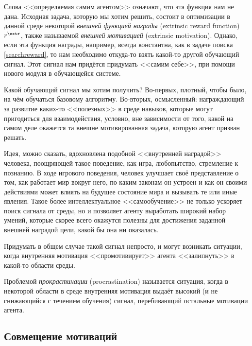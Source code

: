 Слова <<определяемая самим агентом>> означают, что эта функция нам не дана. Исходная задача, которую мы хотим решить, состоит в оптимизации в данной среде некоторой \emph{внешней функцией награды} (extrinsic reward function) $r^{\extr}$, также называемой \emph{внешней мотивацией} (extrinsic motivation). Однако, если эта функция награды, например, всегда константна, как в задаче поиска \eqref{searchreward}, то нам необходимо откуда-то взять какой-то другой обучающий сигнал. Этот сигнал нам придётся придумать <<самим себе>>, при помощи нового модуля в обучающейся системе.

Какой обучающий сигнал мы хотим получить? Во-первых, плотный, чтобы было, на чём обучаться базовому алгоритму. Во-вторых, осмысленный: награждающий за развитие каких-то <<полезных>> в среде навыков, которые могут пригодиться для взаимодействия, условно, вне зависимости от того, какой на самом деле окажется та внешне мотивированная задача, которую агент призван решать.

\begin{example}
Идея, можно сказать, вдохновлена подобной <<внутренней наградой>> человека, поощряющей такое поведение, как игра, любопытство, стремление к познанию. В ходе игрового поведения, человек улучшает своё представление о том, как работает мир вокруг него, по каким законам он устроен и как он своими действиями может влиять на будущее состояние мира и вызывать те или иные явления. Такое более интеллектуальное <<самообучение>> не только ускоряет поиск сигнала от среды, но и позволяет агенту выработать широкий набор умений, которые скорее всего окажутся полезны для достижения заданной внешней наградой цели, какой бы она ни оказалась.
\end{example}

Придумать в общем случае такой сигнал непросто, и могут возникать ситуации, когда внутренняя мотивация <<промотивирует>> агента <<залипнуть>> в какой-то области среды.

\begin{definition}
Проблемой \emph{прокрастинации} (procrastination) называется ситуация, когда в некоторой области в среде внутренняя мотивация выдаёт высокий (и не снижающийся с течением обучения) сигнал, перебивающий остальные мотивации агента.
\end{definition}

\subsection{Совмещение мотиваций}

